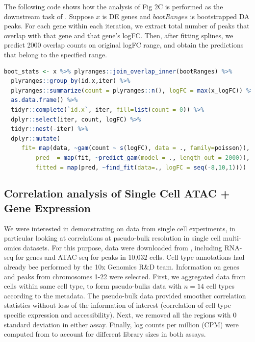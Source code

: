 \documentclass{article}
\begin{document}
The following code shows how the analysis of Fig 2C is
performed as the downstream task of \bootranges. Suppose $x$ is DE genes and $bootRanges$ is bootstrapped DA peaks. For each gene within each iteration, we extract total number of peaks that overlap with that gene and that gene's logFC. Then, after fitting splines, we predict 2000 overlap counts on original logFC range, and obtain the predictions that belong to the specified range.
\begin{lstlisting}[language=R]
boot_stats <- x %>% plyranges::join_overlap_inner(bootRanges) %>%
  plyranges::group_by(id.x,iter) %>%
  plyranges::summarize(count = plyranges::n(), logFC = max(x_logFC)) %>%
  as.data.frame() %>%
  tidyr::complete(`id.x`, iter, fill=list(count = 0)) %>%
  dplyr::select(iter, count, logFC) %>%
  tidyr::nest(-iter) %>%
  dplyr::mutate(
	 fit= map(data, ~gam(count ~ s(logFC), data = ., family=poisson)),
         pred  = map(fit, ~predict_gam(model = ., length_out = 2000)),
         fitted = map(pred, ~find_fit(data=., logFC = seq(-8,10,1))))

\end{lstlisting} 

\pagebreak

\subsection{Correlation analysis of Single Cell ATAC + Gene Expression}

We were interested in demonstrating \bootranges on data from single
cell experiments, in particular looking at correlations at
pseudo-bulk resolution in single cell multi-omics datasets.
For this purpose, 
data were downloaded from \citet{Vignette}, including
RNA-seq for genes and ATAC-seq for peaks in 10,032 cells.
Cell type annotations had already bee performed
by the 10x Genomics R\&D team. Information on genes and peaks from
chromosomes 1-22 were selected.
First, we aggregated data from cells within same cell type, to form
pseudo-bulks data with $n=14$ cell types according to the metadata. 
The pseudo-bulk data provided smoother correlation statistics without
loss of the information of interest (correlation of cell-type-specific
expression and accessibility).
Next, we removed all the regions with 0
standard deviation in either assay.
Finally, log counts per million (CPM) were computed
from  \citep{edgeR2010Robinson} to account for different library sizes
in both assays.
\end{document}
